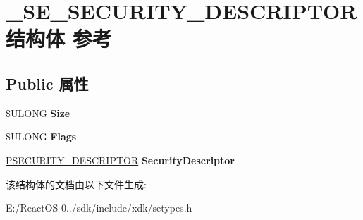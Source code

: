 \hypertarget{struct___s_e___s_e_c_u_r_i_t_y___d_e_s_c_r_i_p_t_o_r}{}\section{\+\_\+\+S\+E\+\_\+\+S\+E\+C\+U\+R\+I\+T\+Y\+\_\+\+D\+E\+S\+C\+R\+I\+P\+T\+O\+R结构体 参考}
\label{struct___s_e___s_e_c_u_r_i_t_y___d_e_s_c_r_i_p_t_o_r}
\subsection*{Public 属性}
\begin{DoxyCompactItemize}
\item 
\mbox{\label{struct___s_e___s_e_c_u_r_i_t_y___d_e_s_c_r_i_p_t_o_r_adbe65debad24ff4461695553bd0c5ae4}} 
\$U\+L\+O\+NG {\bfseries Size}
\item 
\mbox{\label{struct___s_e___s_e_c_u_r_i_t_y___d_e_s_c_r_i_p_t_o_r_a1d3e08b7badea5453443481fb22a3acc}} 
\$U\+L\+O\+NG {\bfseries Flags}
\item 
\mbox{\label{struct___s_e___s_e_c_u_r_i_t_y___d_e_s_c_r_i_p_t_o_r_ac93179f0e894e11745cba1a7faabb662}} 
\hyperlink{struct___s_e_c_u_r_i_t_y___d_e_s_c_r_i_p_t_o_r}{P\+S\+E\+C\+U\+R\+I\+T\+Y\+\_\+\+D\+E\+S\+C\+R\+I\+P\+T\+OR} {\bfseries Security\+Descriptor}
\end{DoxyCompactItemize}


该结构体的文档由以下文件生成\+:\begin{DoxyCompactItemize}
\item 
E\+:/\+React\+O\+S-\/0../sdk/include/xdk/setypes.\+h\end{DoxyCompactItemize}

